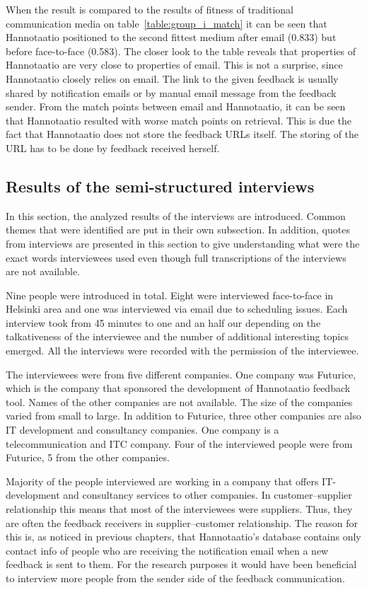 \documentclass[english,12pt,a4paper,pdftex]{article}
\begin{document}
When the result is compared to the results of fitness of traditional communication media on table~\ref{table:group_i_match} it can be seen that Hannotaatio positioned to the second fittest medium after email (0.833) but before face-to-face (0.583). The closer look to the table reveals that properties of Hannotaatio are very close to properties of email. This is not a surprise, since Hannotaatio closely relies on email. The link to the given feedback is usually shared by notification emails or by manual email message from the feedback sender. From the match points between email and Hannotaatio, it can be seen that Hannotaatio resulted with worse match points on retrieval. This is due the fact that Hannotaatio does not store the feedback \acs{URL}s itself. The storing of the \ac{URL} has to be done by feedback received herself.

\subsection{Results of the semi-structured interviews}

In this section, the analyzed results of the interviews are introduced. Common themes that were identified are put in their own subsection. In addition, quotes from interviews are presented in this section to give understanding what were the exact words interviewees used even though full transcriptions of the interviews are not available.

Nine people were introduced in total. Eight were interviewed face-to-face in Helsinki area and one was interviewed  via email due to scheduling issues. Each interview took from 45 minutes to one and an half our depending on the talkativeness of the interviewee and the number of additional interesting topics emerged. All the interviews were recorded with the permission of the interviewee. 

The interviewees were from five different companies. One company was Futurice, which is the company that sponsored the development of Hannotaatio feedback tool. Names of the other companies are not available. The size of the companies varied from small to large. In addition to Futurice, three other companies are also IT development and consultancy companies. One company is a telecommunication and ITC company. Four of the interviewed people were from Futurice, 5 from the other companies.

Majority of the people interviewed are working in a company that offers IT-development and consultancy services to other companies. In customer--supplier relationship this means that most of the interviewees were suppliers. Thus, they are often the feedback receivers in supplier--customer relationship. The reason for this is, as noticed in previous chapters, that Hannotaatio's database contains only contact info of people who are receiving the notification email when a new feedback is sent to them. For the research purposes it would have been beneficial to interview more people from the sender side of the feedback communication.
\end{document}
